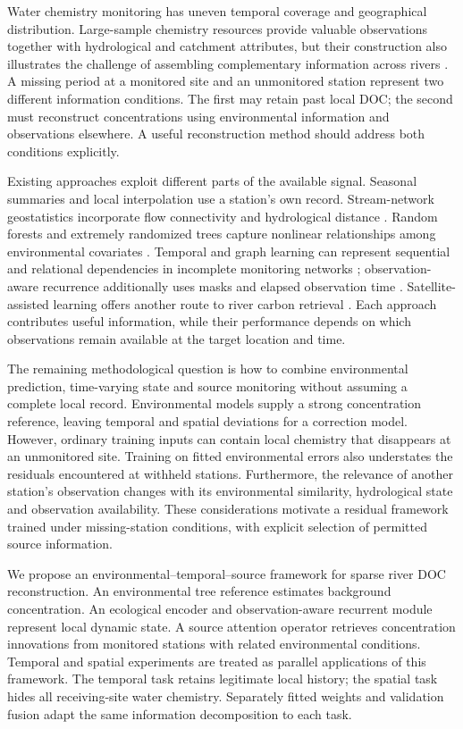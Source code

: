 \documentclass[11pt]{article}
\begin{document}
Water chemistry monitoring has uneven temporal coverage and geographical distribution. Large-sample chemistry resources provide valuable observations together with hydrological and catchment attributes, but their construction also illustrates the challenge of assembling complementary information across rivers \citep{sterle2024}. A missing period at a monitored site and an unmonitored station represent two different information conditions. The first may retain past local DOC; the second must reconstruct concentrations using environmental information and observations elsewhere. A useful reconstruction method should address both conditions explicitly.

Existing approaches exploit different parts of the available signal. Seasonal summaries and local interpolation use a station's own record. Stream-network geostatistics incorporate flow connectivity and hydrological distance \citep{verhoef2006}. Random forests and extremely randomized trees capture nonlinear relationships among environmental covariates \citep{breiman2001,geurts2006}. Temporal and graph learning can represent sequential and relational dependencies in incomplete monitoring networks \citep{cini2022}; observation-aware recurrence additionally uses masks and elapsed observation time \citep{che2018}. Satellite-assisted learning offers another route to river carbon retrieval \citep{tian2025}. Each approach contributes useful information, while their performance depends on which observations remain available at the target location and time.

The remaining methodological question is how to combine environmental prediction, time-varying state and source monitoring without assuming a complete local record. Environmental models supply a strong concentration reference, leaving temporal and spatial deviations for a correction model. However, ordinary training inputs can contain local chemistry that disappears at an unmonitored site. Training on fitted environmental errors also understates the residuals encountered at withheld stations. Furthermore, the relevance of another station's observation changes with its environmental similarity, hydrological state and observation availability. These considerations motivate a residual framework trained under missing-station conditions, with explicit selection of permitted source information.

We propose an environmental--temporal--source framework for sparse river DOC reconstruction. An environmental tree reference estimates background concentration. An ecological encoder and observation-aware recurrent module represent local dynamic state. A source attention operator retrieves concentration innovations from monitored stations with related environmental conditions. Temporal and spatial experiments are treated as parallel applications of this framework. The temporal task retains legitimate local history; the spatial task hides all receiving-site water chemistry. Separately fitted weights and validation fusion adapt the same information decomposition to each task.
\end{document}

